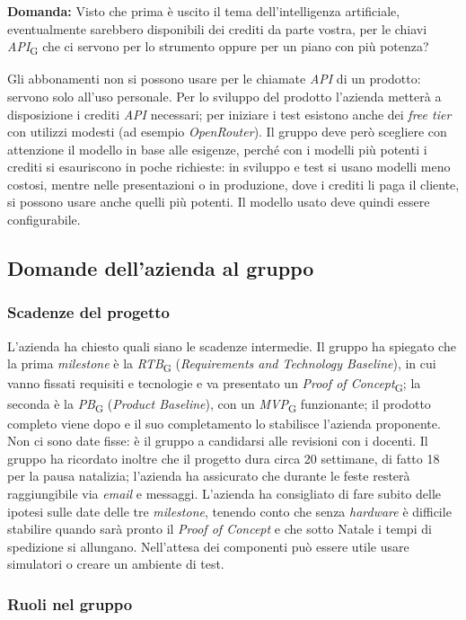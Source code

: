 \documentclass[12pt,a4paper]{article}
\newcommand{\gl}[1]{\emph{#1}\textsubscript{\scriptsize G}}
\begin{document}
\textbf{Domanda:} Visto che prima è uscito il tema dell'intelligenza artificiale, eventualmente sarebbero disponibili dei crediti da parte vostra, per le chiavi \gl{API} che ci servono per lo strumento oppure per un piano con più potenza?

Gli abbonamenti non si possono usare per le chiamate \emph{API} di un prodotto: servono solo all'uso personale. Per lo sviluppo del prodotto l'azienda metterà a disposizione i crediti \emph{API} necessari; per iniziare i test esistono anche dei \emph{free tier} con utilizzi modesti (ad esempio \emph{OpenRouter}). Il gruppo deve però scegliere con attenzione il modello in base alle esigenze, perché con i modelli più potenti i crediti si esauriscono in poche richieste: in sviluppo e test si usano modelli meno costosi, mentre nelle presentazioni o in produzione, dove i crediti li paga il cliente, si possono usare anche quelli più potenti. Il modello usato deve quindi essere configurabile.

\subsection{Domande dell'azienda al gruppo}

\subsubsection{Scadenze del progetto}

L'azienda ha chiesto quali siano le scadenze intermedie. Il gruppo ha spiegato che la prima \emph{milestone} è la \gl{RTB} (\emph{Requirements and Technology Baseline}), in cui vanno fissati requisiti e tecnologie e va presentato un \gl{Proof of Concept}; la seconda è la \gl{PB} (\emph{Product Baseline}), con un \gl{MVP} funzionante; il prodotto completo viene dopo e il suo completamento lo stabilisce l'azienda proponente. Non ci sono date fisse: è il gruppo a candidarsi alle revisioni con i docenti. Il gruppo ha ricordato inoltre che il progetto dura circa 20 settimane, di fatto 18 per la pausa natalizia; l'azienda ha assicurato che durante le feste resterà raggiungibile via \emph{email} e messaggi. L'azienda ha consigliato di fare subito delle ipotesi sulle date delle tre \emph{milestone}, tenendo conto che senza \emph{hardware} è difficile stabilire quando sarà pronto il \emph{Proof of Concept} e che sotto Natale i tempi di spedizione si allungano. Nell'attesa dei componenti può essere utile usare simulatori o creare un ambiente di test.

\subsubsection{Ruoli nel gruppo}
\end{document}
